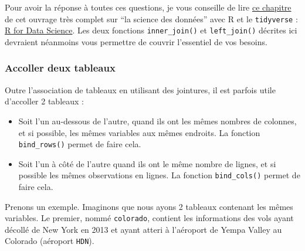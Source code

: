 \documentclass[a4paperpaper,]{article}
\newenvironment{Shaded}{\begin{snugshade}}{\end{snugshade}}
\newcommand{\KeywordTok}[1]{\textcolor[rgb]{0.12,0.11,0.11}{\textbf{#1}}}
\newcommand{\NormalTok}[1]{\textcolor[rgb]{0.12,0.11,0.11}{#1}}
\newcommand{\OperatorTok}[1]{\textcolor[rgb]{0.12,0.11,0.11}{#1}}
\newcommand{\StringTok}[1]{\textcolor[rgb]{0.75,0.01,0.01}{#1}}
\providecommand{\tightlist}{%
  \setlength{\itemsep}{0pt}\setlength{\parskip}{0pt}}
\begin{document}
Pour avoir la réponse à toutes ces questions, je vous conseille de lire \href{http://r4ds.had.co.nz/relational-data.html}{ce chapitre} de cet ouvrage très complet sur ``la science des données'' avec R et le \texttt{tidyverse} : \href{http://r4ds.had.co.nz}{R for Data Science}. Les deux fonctions \texttt{inner\_join()} et \texttt{left\_join()} décrites ici devraient néanmoins vous permettre de couvrir l'essentiel de vos besoins.

\hypertarget{accoller-deux-tableaux}{%
\subsubsection{Accoller deux tableaux}\label{accoller-deux-tableaux}}

Outre l'association de tableaux en utilisant des jointures, il est parfois utile d'accoller 2 tableaux :

\begin{itemize}
\tightlist
\item
  Soit l'un au-dessous de l'autre, quand ils ont les mêmes nombres de colonnes, et si possible, les mêmes variables aux mêmes endroits. La fonction \texttt{bind\_rows()} permet de faire cela.
\item
  Soit l'un à côté de l'autre quand ils ont le même nombre de lignes, et si possible les mêmes observations en lignes. La fonction \texttt{bind\_cols()} permet de faire cela.
\end{itemize}

Prenons un exemple. Imaginons que nous ayons 2 tableaux contenant les mêmes variables. Le premier, nommé \texttt{colorado}, contient les informations des vols ayant décollé de New York en 2013 et ayant atteri à l'aéroport de Yempa Valley au Colorado (aéroport \texttt{HDN}).

\begin{Shaded}
\end{Shaded}
\end{document}
